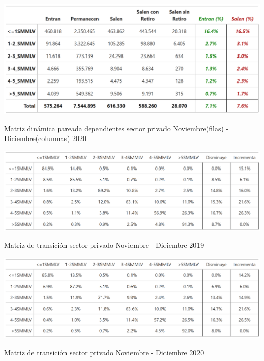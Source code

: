 \begin{table}[!h]
\centering
\includegraphics[width = 15cm]{results/02_longitudinal/salida_resumen_dependientes_interes_20.png}
\caption{Matriz dinámica pareada dependientes sector privado Noviembre(filas) - Diciembre(columnas) 2020}%
\label{tabla:sector_privado:matriz_dinamica_mes_interes_20}
\end{table}

\begin{table}[!h]
\centering
\includegraphics[width = 15cm]{results/02_longitudinal/salida_matriz_transicion_dependientes_19.png}
\caption{Matriz de transición sector privado Noviembre - Diciembre 2019}%
\label{tabla:sector_privado:matriz_transicion_mes_interes_19}
\end{table}

\begin{table}[!h]
\centering
\includegraphics[width = 15cm]{results/02_longitudinal/salida_matriz_transicion_dependientes_20.png}
\caption{Matriz de transición sector privado Noviembre - Diciembre 2020}%
\label{tabla:sector_privado:matriz_transicion_mes_interes_20}
\end{table}



